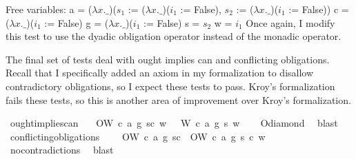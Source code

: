 \begin{isabellebody}
{  Free variables:
    a = ($\lambda x. \_$)($s_1$ := ($\lambda x. \_$)($i_1$ := False), $s_2$ := ($\lambda x. \_$)($i_1$ := False))
    c = ($\lambda x. \_$)($i_1$ := False)
    g = ($\lambda x. \_$)($i_1$ := False)
    s = $s_2$
    w = $i_1$\color{black}
Once again, I modify this test to use the dyadic obligation operator instead of the monadic operator.%
}%
\endisatagproof
{\isafoldproof}%
%
\isadelimproof
%
\endisadelimproof
%
\begin{isamarkuptext}%
The final set of tests deal with ought implies can and conflicting obligations. Recall that I 
specifically added an axiom in my formalization to disallow contradictory obligations, so I expect 
these tests to pass. Kroy's formalization fails these tests, so this is another area of improvement 
over Kroy's formalization.%
\end{isamarkuptext}\isamarkuptrue%
\isamarkupfalse%
\ ought{\isacharunderscore}implies{\isacharunderscore}can{\isacharcolon}\isanewline
\ \ \ {\isachardoublequoteopen}O{\isacharbraceleft}W\ {\isacharparenleft}c{\isacharcomma}\ a{\isacharcomma}\ g{\isacharparenright}\ s{\isacharbar}c{\isacharbraceright}\ w\ {\isasymlongrightarrow}\ {\isacharparenleft}{\isasymdiamond}\ W\ {\isacharparenleft}c{\isacharcomma}\ a{\isacharcomma}\ g{\isacharparenright}\ s{\isacharparenright}\ w{\isachardoublequoteclose}\isanewline
%
\isadelimproof
\ \ %
\endisadelimproof
%
\isatagproof
{}\isamarkupfalse%
\ O{\isacharunderscore}diamond\ \isamarkupfalse%
\ blast\isanewline
%
%
\endisatagproof
{\isafoldproof}%
%
\isadelimproof
\isanewline
%
\endisadelimproof
\isanewline
{}\isamarkupfalse%
\ conflicting{\isacharunderscore}obligations{\isacharcolon}\isanewline
\ \ \ {\isachardoublequoteopen}{\isasymnot}\ {\isacharparenleft}O{\isacharbraceleft}W\ {\isacharparenleft}c{\isacharcomma}\ a{\isacharcomma}\ g{\isacharparenright}\ s{\isacharbar}c{\isacharbraceright}\ \isactrlbold {\isasymand}\ O{\isacharbraceleft}\isactrlbold {\isasymnot}{\isacharparenleft}W\ {\isacharparenleft}c{\isacharcomma}\ a{\isacharcomma}\ g{\isacharparenright}\ s{\isacharparenright}{\isacharbar}\ c{\isacharbraceright}{\isacharparenright}\ w{\isachardoublequoteclose}\isanewline
%
\isadelimproof
\ \ %
\endisadelimproof
%
\isatagproof
{}\isamarkupfalse%
\ no{\isacharunderscore}contradictions\ \isamarkupfalse%
\ blast\isanewline
%
\end{isabellebody}
